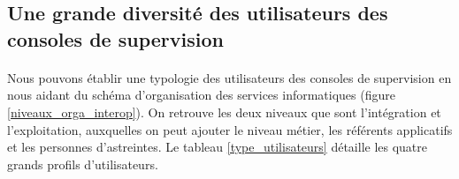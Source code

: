 		\subsection{Une grande diversité des utilisateurs des consoles de
		supervision}
			\paragraph{}%
			Nous pouvons établir une typologie des utilisateurs des consoles de
			supervision en nous aidant du schéma d’organisation
			des services informatiques (figure \ref{niveaux_orga_interop}). On retrouve les
			deux niveaux que sont l’intégration et l’exploitation, auxquelles on peut
			ajouter le niveau métier, les référents applicatifs et les personnes
			d'astreintes.\newline
			Le tableau \ref{type_utilisateurs} détaille les quatre grands profils
			d’utilisateurs.
